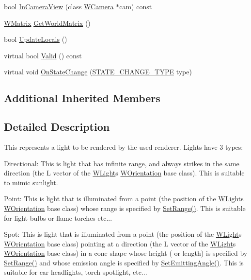 \begin{DoxyCompactItemize}
bool \hyperlink{class_w_light_a0c9afa88fe12e16c9fc7d67c554a0703}{In\+Camera\+View} (class \hyperlink{class_w_camera}{W\+Camera} $\ast$cam) const 
\item 
\hyperlink{class_w_matrix}{W\+Matrix} \hyperlink{class_w_light_ad420215debbf712494c6f9db7ed5d046}{Get\+World\+Matrix} ()
\item 
bool \hyperlink{class_w_light_a49207baa2ff79318151d403795258504}{Update\+Locals} ()
\item 
virtual bool \hyperlink{class_w_light_ac5919908df0dda965ed3f145857ca2e9}{Valid} () const 
\item 
virtual void \hyperlink{class_w_light_a8b953335e946cfba7dc7aa1441cddf7f}{On\+State\+Change} (\hyperlink{_w_orientation_8h_afe94de0a48bbd7b343ab18bc318cef28}{S\+T\+A\+T\+E\+\_\+\+C\+H\+A\+N\+G\+E\+\_\+\+T\+Y\+PE} type)
\end{DoxyCompactItemize}
\subsection*{Additional Inherited Members}


\subsection{Detailed Description}
This represents a light to be rendered by the used renderer. Lights have 3 types\+:
\begin{DoxyItemize}
\item Directional\+: This is light that has infinite range, and always strikes in the same direction (the L vector of the \hyperlink{class_w_light}{W\+Light}\textquotesingle{}s \hyperlink{class_w_orientation}{W\+Orientation} base class). This is suitable to mimic sunlight.
\item Point\+: This is light that is illuminated from a point (the position of the \hyperlink{class_w_light}{W\+Light}\textquotesingle{}s \hyperlink{class_w_orientation}{W\+Orientation} base class) whose range is specified by \hyperlink{class_w_light_a24ad8bb394f9acecd76e9c92483fa793}{Set\+Range()}. This is suitable for light bulbs or flame torches etc...
\item Spot\+: This is light that is illuminated from a point (the position of the \hyperlink{class_w_light}{W\+Light}\textquotesingle{}s \hyperlink{class_w_orientation}{W\+Orientation} base class) pointing at a direction (the L vector of the \hyperlink{class_w_light}{W\+Light}\textquotesingle{}s \hyperlink{class_w_orientation}{W\+Orientation} base class) in a cone shape whose height ( or length) is specified by \hyperlink{class_w_light_a24ad8bb394f9acecd76e9c92483fa793}{Set\+Range()} and whose emission angle is specified by \hyperlink{class_w_light_a801d2cecfd84eedc40cff675d8ac3b33}{Set\+Emitting\+Angle()}. This is suitable for car headlights, torch spotlight, etc... 
\end{DoxyItemize}

